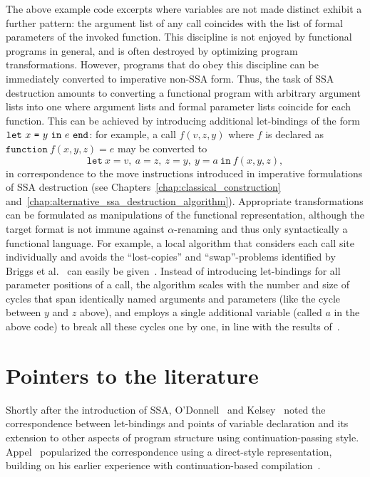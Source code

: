 The above example code excerpts where variables are not made distinct
exhibit a further pattern: the argument list of any call coincides
with the list of formal parameters of the invoked function. This
discipline is not enjoyed by functional programs in general, and is
often destroyed by optimizing program transformations. However,
programs that do obey this discipline can be immediately converted to
imperative non-SSA form. Thus, the task of SSA destruction amounts to
converting a functional program with arbitrary argument lists into one
where argument lists and formal parameter lists coincide for each
function. This can be achieved by introducing additional let-bindings
of the form $\texttt{let}\ {x}\ \texttt{=}\ {y}\ \texttt{in}\ {e}\ \texttt{end}$: for example, a call $f(v,z,y)$ where $f$
is declared as $\texttt{function}\ f(x,y,z) = e$ may be converted to
$$\texttt{let}\ x = v,\ a = z,\ z = y,\ y = a\ \texttt{in}\ {f(x,y,z)},$$ in
correspondence to the move instructions introduced in imperative
formulations of SSA destruction (see
Chapters~\ref{chap:classical_construction}
and~\ref{chap:alternative_ssa_destruction_algorithm}). Appropriate
transformations can be formulated as manipulations of the functional
representation, although the target format is not immune against
$\alpha$-renaming and thus only syntactically a functional
language. For example, a local algorithm that considers each call site
individually and avoids the ``lost-copies'' and ``swap''-problems
identified by Briggs et al.~\cite{DBLP:journals/spe/BriggsCHS98} can
easily be given~\cite{DBLP:journals/entcs/Beringer07}. Instead of
introducing let-bindings for all parameter positions of a call, the
algorithm scales with the number and size of cycles that span
identically named arguments and parameters (like the cycle between $y$
and $z$ above), and employs a single additional variable (called $a$
in the above code) to break all these cycles one by one, in line with
the results of~\cite{May:1989:PAP:68018.68035}.


\section{Pointers to the literature}
\label{section:Part1:Semantics:Literature}



Shortly after the introduction of SSA, O'Donnell~\cite{ODonnellPhD}
and Kelsey~\cite{Kelsey95} noted the correspondence between
let-bindings and points of variable declaration and its extension to
other aspects of program structure using
continuation-passing style. Appel~\cite{Appel98:SSA,Appel:MCIML} popularized
the correspondence using a direct-style representation, building on
his earlier experience with continuation-based
compilation~\cite{Appel:CWC}. 

